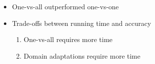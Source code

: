 \begin{frame}
\begin{columns}
				\begin{itemize}
					\item \scriptsize{One-vs-all outperformed one-vs-one}
					\item \scriptsize{Trade-offs between running time and accuracy}
						\begin{enumerate}
							\item \scriptsize{One-vs-all requires more time}
							\item \scriptsize{Domain adaptations require more time}
						\end{enumerate}
				\end{itemize}
		\end{columns}

\end{frame}
